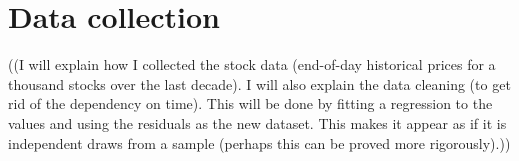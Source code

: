 \section{Data collection}
\label{sec:numerical:datacollection}

((I will explain how I collected the stock data (end-of-day historical prices for a thousand stocks over the last decade). I will also explain the data cleaning (to get rid of the dependency on time). This will be done by fitting a regression to the values and using the residuals as the new dataset. This makes it appear as if it is independent draws from a sample (perhaps this can be proved more rigorously).))